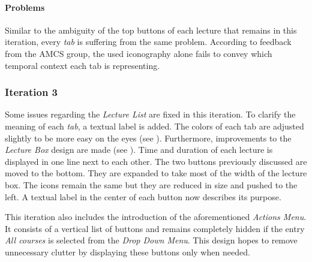 \paragraph{Problems}
Similar to the ambiguity of the top buttons of each lecture that remains in this iteration, every \emph{tab} is suffering from the same problem. According to feedback from the AMCS group, the used iconography alone fails to convey which temporal context each tab is representing.

\subsubsection{Iteration 3}
Some issues regarding the \emph{Lecture List} are fixed in this iteration.
To clarify the meaning of each \emph{tab}, a textual label is added. 
The colors of each tab are adjusted slightly to be more easy on the eyes (see ). Furthermore, improvements to the \emph{Lecture Box} design are made (see ). Time and duration of each lecture is displayed in one line next to each other. The two buttons previously discussed are moved to the bottom. They are expanded to take most of the width of the lecture box. The icons remain the same but they are reduced in size and pushed to the left.
A textual label in the center of each button now describes its purpose.

This iteration also includes the introduction of the aforementioned \emph{Actions Menu}. It consists of a vertical list of buttons and remains completely hidden if the entry \emph{All courses} is selected from the \emph{Drop Down Menu}. This design hopes to remove unnecessary clutter by displaying these buttons only when needed.

